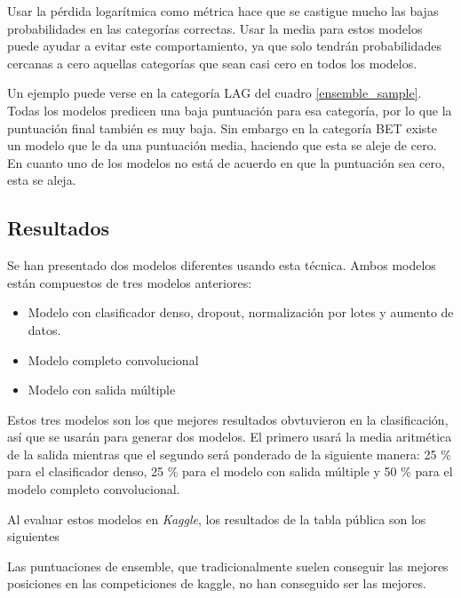 \begin{itemize}
Usar la pérdida logarítmica como métrica hace que se castigue mucho las bajas
probabilidades en las categorías correctas. Usar la media para estos modelos
puede ayudar a evitar este comportamiento, ya que solo tendrán probabilidades
cercanas a cero aquellas categorías que sean casi cero en todos los modelos.

Un ejemplo puede verse en la categoría LAG del cuadro \ref{ensemble_sample}.
Todas los modelos predicen una baja puntuación para esa categoría, por lo que la
puntuación final también es muy baja. Sin embargo en la categoría BET existe un
modelo que le da una puntuación media, haciendo que esta se aleje de cero. En
cuanto uno de los modelos no está de acuerdo en que la puntuación sea cero, esta
se aleja.

\subsection{Resultados}

Se han presentado dos modelos diferentes usando esta técnica. Ambos modelos
están compuestos de tres modelos anteriores:

\begin{itemize}
    \item{Modelo con clasificador denso, dropout, normalización por lotes y
        aumento de datos.}
    \item{Modelo completo convolucional}
    \item{Modelo con salida múltiple}
\end{itemize}

Estos tres modelos son los que mejores resultados obvtuvieron en la
clasificación, así que se usarán para generar dos modelos. El primero usará la
media aritmética de la salida mientras que el segundo será ponderado de la
siguiente manera: 25 \% para el clasificador denso, 25 \% para el modelo con
salida múltiple y 50 \% para el modelo completo convolucional.

Al evaluar estos modelos en \textit{Kaggle}, los resultados de la tabla pública
son los siguientes

\begin{itemize}
    \item{Media aritmética sobre los tres modelos: \textbf{0.9175}
    \item{Media ponderada favoreciendo el modelo completo convolucional: \textbf{0.8975}
\end{itemize}

Las puntuaciones de ensemble, que tradicionalmente suelen conseguir las mejores posiciones en las competiciones de kaggle, no han conseguido ser las mejores.


\end{itemize}
